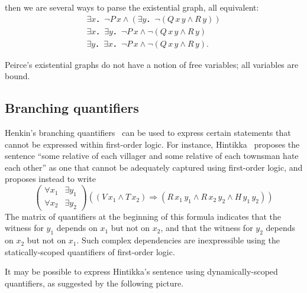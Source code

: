 \documentclass[svgnames]{llncs}
\begin{document}
then we are several ways to parse the existential graph, all equivalent: 
\begin{eqnarray*}
∃x．¬P\,x ∧ (∃y．¬ (Q\,x\,y ∧ R\,y))
\\
∃x．∃y．¬P\,x ∧ ¬ (Q\,x\,y ∧ R\,y) 
\\ 
∃y．∃x．¬P\,x ∧ ¬ (Q\,x\,y ∧ R\,y).
\end{eqnarray*}

\noindent Peirce's existential graphs do not have a notion of free variables; all variables are bound. 

\subsection{Branching quantifiers}

Henkin's branching quantifiers~\cite{henkin61} can be used to express certain statements that cannot be expressed within first-order logic. For instance, Hintikka~\cite{hintikka74} proposes the sentence ``some relative of each villager and some relative of each townsman hate each other'' as one that cannot be adequately captured using first-order logic, and proposes instead to write 
\[
\left(\begin{array}{ll}\forall x_1 & \exists y_1\\ \forall x_2 & \exists y_2\end{array}\right) \left((V\,x_1 ∧ T\,x_2) ⇒ (R\,x_1\,y_1 ∧ R\,x_2\,y_2 ∧ H\,y_1\,y_2)\right)
\]
The matrix of quantifiers at the beginning of this formula indicates that the witness for $y_1$ depends on $x_1$ but not on $x_2$, and that the witness for $y_2$ depends on $x_2$ but not on $x_1$. Such complex dependencies are inexpressible using the statically-scoped quantifiers of first-order logic.

It may be possible to express Hintikka's sentence using dynamically-scoped quantifiers, as suggested by the following picture.
\begin{center}
\end{center}
\end{document}
